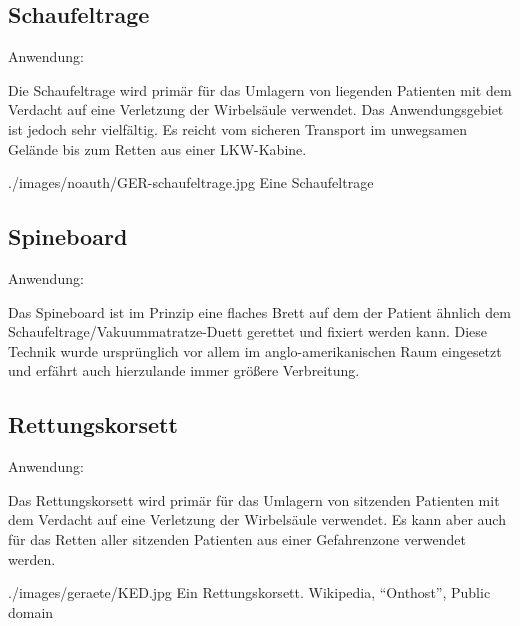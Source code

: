 \subsection{Schaufeltrage}
\label{topic:schaufeltrage-beschreibung}

{
Anwendung: 

Die Schaufeltrage wird primär für das Umlagern von liegenden
Patienten mit dem Verdacht auf eine Verletzung der
Wirbelsäule verwendet. Das Anwendungsgebiet ist jedoch sehr
vielfältig. Es reicht vom sicheren Transport im unwegsamen
Gelände bis zum Retten aus einer LKW-Kabine.
}{

}
{./images/noauth/GER-schaufeltrage.jpg}
{Eine Schaufeltrage}
{}

\subsection{Spineboard}
\label{topic:spineboard-beschreibung}

Anwendung: 

Das Spineboard ist im Prinzip eine flaches Brett auf dem
der Patient ähnlich dem Schaufeltrage/Vakuummatratze-Duett
gerettet und fixiert werden kann. Diese Technik wurde
ursprünglich vor allem im anglo-amerikanischen Raum
eingesetzt und erfährt auch hierzulande immer größere
Verbreitung.



\subsection{Rettungskorsett}
\label{topic:rettungskorsett-beschreibung}

Anwendung: 

{
Das Rettungskorsett wird primär für das Umlagern von
sitzenden Patienten mit dem Verdacht auf eine Verletzung der
Wirbelsäule verwendet. Es kann aber auch für das Retten
aller sitzenden Patienten aus einer Gefahrenzone verwendet
werden.
}{

}
{./images/geraete/KED.jpg}
{Ein Rettungskorsett.}
{Wikipedia, "`Onthost"', Public domain}




